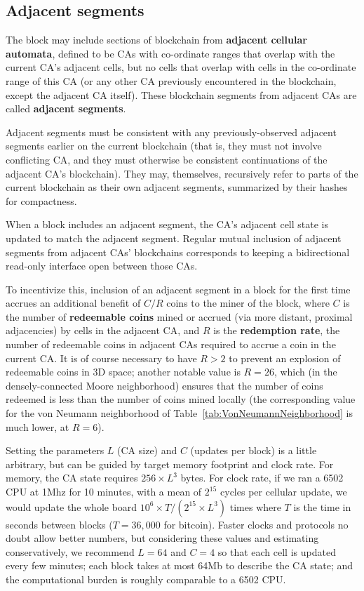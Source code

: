 \documentclass{article}
\begin{document}
\subsection{Adjacent segments}

The block may include sections of blockchain from {\bf adjacent cellular automata},
defined to be CAs with co-ordinate ranges that
overlap with the current CA's adjacent cells,
but no cells that overlap with
cells in the co-ordinate range of this CA (or any other CA previously encountered in the blockchain,
except the adjacent CA itself).
These blockchain segments from adjacent CAs are called {\bf adjacent segments}.

Adjacent segments must be consistent with any previously-observed adjacent segments
earlier on the current blockchain (that is, they must not involve conflicting CA,
and they must otherwise be consistent continuations of the adjacent CA's blockchain).
They may, themselves, recursively refer to parts of the current blockchain as their own adjacent segments,
summarized by their hashes for compactness.

When a block includes an adjacent segment, the CA's adjacent cell state is updated to match the adjacent segment.
Regular mutual inclusion of adjacent segments from adjacent CAs' blockchains
corresponds to keeping a bidirectional read-only interface open between those CAs.

To incentivize this,
inclusion of an adjacent segment in a block for the first time
accrues an additional benefit of $C/R$ coins to the miner of the block,
where $C$ is the number of {\bf redeemable coins} mined or accrued (via more distant, proximal adjacencies)
by cells in the adjacent CA,
and $R$ is the {\bf redemption rate}, the number of redeemable coins in adjacent CAs
required to accrue a coin in the current CA.
It is of course necessary to have $R>2$ to prevent an explosion of redeemable coins in 3D space;
another notable value is $R=26$, which (in the densely-connected Moore neighborhood)
ensures that the number of coins redeemed is less than the number of coins mined locally
(the corresponding value for the von Neumann neighborhood of Table~\ref{tab:VonNeumannNeighborhood}
is much lower, at $R=6$).

Setting the parameters $L$ (CA size) and $C$ (updates per block)
is a little arbitrary, but can be guided by target memory footprint and clock rate.
For memory, the CA state requires $256 \times L^3$ bytes.
For clock rate, if we ran a 6502 CPU at 1Mhz for 10 minutes, with a mean of $2^{15}$ cycles per cellular update,
we would update the whole board $10^6 \times T / (2^{15} \times L^3)$ times
where $T$ is the time in seconds between blocks ($T=36,000$ for bitcoin).
Faster clocks and protocols no doubt allow better numbers,
but considering these values and estimating conservatively,
we recommend $L=64$ and $C=4$ so that
each cell is updated every few minutes;
each block takes at most 64Mb to describe the CA state;
and the computational burden is roughly comparable to a 6502 CPU.
\end{document}
